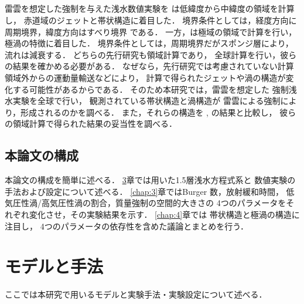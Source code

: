 \documentclass[a4j,12pt,openbib,oneside]{jreport}
\begin{document}
\section{}
\label{sec:intro3}
雷雲を想定した強制を与えた浅水数値実験を
\cite{Showman2007}は低緯度から中緯度の領域を計算し，
赤道域のジェットと帯状構造に着目した．
境界条件としては，経度方向に周期境界，緯度方向はすべり境界 である．
%
一方，\cite{Brueshaber2019}は極域の領域で計算を行い，
極渦の特徴に着目した．
境界条件としては，周期境界だがスポンジ層により，流れは減衰する．
%
どちらの先行研究も領域計算であり，
全球計算を行い，彼らの結果を確かめる必要がある．
なぜなら，先行研究では考慮されていない計算領域外からの運動量輸送などにより，
計算で得られたジェットや渦の構造が変化する可能性があるからである．
%
%
%
そのため本研究では，雷雲を想定した
強制浅水実験を全球で行い，
観測されている帯状構造と渦構造が
雷雲による強制により，形成されるのかを調べる．
%
また，それらの構造を
\cite{Showman2007}, \cite{Brueshaber2019} の結果と比較し，
彼らの領域計算で得られた結果の妥当性を調べる．
%
\def\intro4{本論文の構成}
\section{\intro4}
\label{sec:intro4}
本論文の構成を簡単に述べる．
\ref{chap:2}章では用いた1.5層浅水方程式系と
数値実験の手法および設定について述べる．
\ref{chap:3}章ではBurger 数，放射緩和時間，
低気圧性渦/高気圧性渦の割合，質量強制の空間的大きさの
4つのパラメータをそれぞれ変化させ，その実験結果を示す．
\ref{chap:4}章では
帯状構造と極渦の構造に注目し，
4つのパラメータの依存性を含めた議論とまとめを行う．
%
%
\setcounter{table}{0}
\def\chap2{モデルと手法}
\chapter{\chap2}
\label{chap:2}
\markright{2 \chap2}
ここでは本研究で用いるモデルと実験手法・実験設定について述べる．
\end{document}
